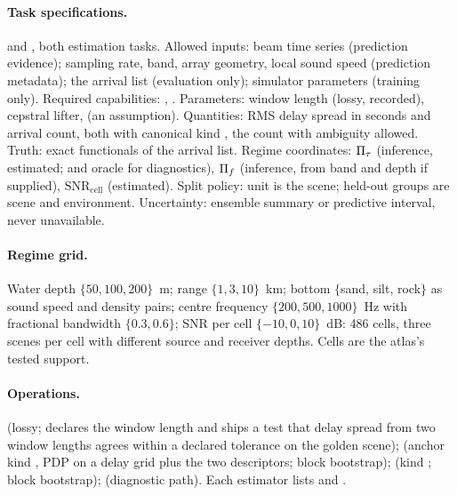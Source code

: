 \documentclass[11pt,a4paper]{article}
\begin{document}
\paragraph{Task specifications.}  and , both estimation tasks. Allowed inputs: beam time series (prediction evidence); sampling rate, band, array geometry, local sound speed (prediction metadata); the arrival list (evaluation only); simulator parameters (training only). Required capabilities: , . Parameters: window length (lossy, recorded), cepstral lifter,  (an assumption). Quantities: RMS delay spread in seconds and arrival count, both with canonical kind , the count with ambiguity allowed. Truth: exact functionals of the arrival list. Regime coordinates: $\Pi_{\tau}$ (inference, estimated; and oracle for diagnostics), $\Pi_{f}$ (inference, from band and depth if supplied), $\mathrm{SNR}_{\mathrm{cell}}$ (estimated). Split policy: unit is the scene; held-out groups are scene and environment. Uncertainty: ensemble summary or predictive interval, never unavailable.

\paragraph{Regime grid.} Water depth $\{50,100,200\}$~m; range $\{1,3,10\}$~km; bottom $\{$sand, silt, rock$\}$ as sound speed and density pairs; centre frequency $\{200,500,1000\}$~Hz with fractional bandwidth $\{0.3,0.6\}$; SNR per cell $\{-10,0,10\}$~dB: 486 cells, three scenes per cell with different source and receiver depths. Cells are the atlas's tested support.

\paragraph{Operations.}  (lossy; declares the window length and ships a test that delay spread from two window lengths agrees within a declared tolerance on the golden scene);  (anchor kind , PDP on a delay grid plus the two descriptors; block bootstrap);  (kind ; block bootstrap);  (diagnostic path). Each estimator lists  and .
\end{document}
